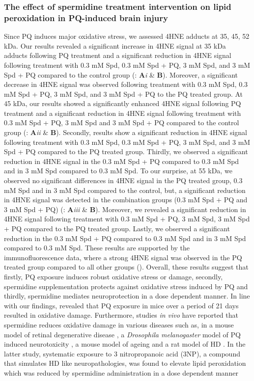 \subsubsection{The effect of spermidine treatment intervention on lipid peroxidation in PQ-induced brain injury}
Since PQ induces major oxidative stress, we assessed 4HNE adducts at 35, 45, 52 kDa. Our results revealed a significant increase in 4HNE signal at 35 kDa adducts following PQ treatment and a significant reduction in 4HNE signal following treatment with 0.3 mM Spd, 0.3 mM Spd + PQ, 3 mM Spd, and 3 mM Spd + PQ compared to the control group (: \textbf{A}\textit{i} \& \textbf{B}). Moreover, a significant decrease in 4HNE signal was observed following treatment with 0.3 mM Spd, 0.3 mM Spd + PQ, 3 mM Spd, and 3 mM Spd + PQ to the PQ treated group. At 45 kDa, our results showed a significantly enhanced 4HNE signal following PQ treatment and a significant reduction in 4HNE signal following treatment with 0.3 mM Spd + PQ, 3 mM Spd and 3 mM Spd + PQ compared to the control group (: \textbf{A}\textit{ii} \& \textbf{B}). Secondly, results show a significant reduction in 4HNE signal following treatment with 0.3 mM Spd, 0.3 mM Spd + PQ, 3 mM Spd, and 3 mM Spd + PQ compared to the PQ treated group. Thirdly, we observed a significant reduction in 4HNE signal in the 0.3 mM Spd + PQ compared to 0.3 mM Spd and in 3 mM Spd compared to 0.3 mM Spd. To our surprise, at 55 kDa, we observed no significant differences in 4HNE signal in the PQ treated group, 0.3 mM Spd and in 3 mM Spd compared to the control, but, a significant reduction in 4HNE signal was detected in the combination groups (0.3 mM Spd + PQ and 3 mM Spd + PQ) (: \textbf{A}\textit{iii} \& \textbf{B}). Moreover, we revealed a significant reduction in 4HNE signal following treatment with 0.3 mM Spd + PQ, 3 mM Spd, 3 mM Spd + PQ compared to the PQ treated group. Lastly, we observed a significant reduction in the 0.3 mM Spd + PQ compared to 0.3 mM Spd and in 3 mM Spd compared to 0.3 mM Spd. These results are supported by the immunofluorescence data, where a strong 4HNE signal was observed in the PQ treated group compared to all other groups (). Overall, these results suggest that firstly, PQ exposure induces robust oxidative stress or damage, secondly, spermidine supplementation protects against oxidative stress induced by PQ and thirdly, spermidine mediates neuroprotection in a dose dependent manner. In line with our findings, \citet{Chen2012} revealed that PQ exposure in mice over a period of 21 days resulted in oxidative damage. Furthermore, studies \textit{in vivo} have reported that spermidine reduces oxidative damage in various diseases such as, in a mouse model of retinal degenerative disease \citep{Noro2015}, a \textit{Drosophila melanogaster} model of PQ induced neurotoxicity \citep{Minois2012}, a mouse model of ageing \citep{Eisenberg2009} and a rat model of HD \citep{Jamwal2016}. In the latter study, systematic exposure to 3 nitropropanoic acid (3NP), a compound that simulates HD like neuropathologies, was found to elevate lipid peroxidation which was reduced by spermidine administration in a dose dependent manner 